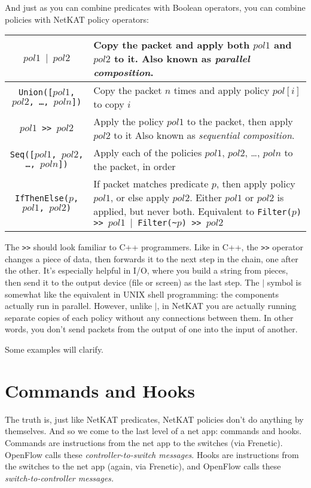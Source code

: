 And just as you can combine predicates with Boolean operators, you can combine policies with NetKAT 
policy operators:

\bigskip
\begin{tabularx}{6in}{|c|X|}
\hline\hline
\texttt{$pol1$ $\vert$ $pol2$} & Copy the packet and apply both $pol1$ and $pol2$ to it.   
Also known as \textit{parallel composition}.
\\ \hline  
\texttt{Union([$pol1$, $pol2$, \ldots, $poln$])} & 
Copy the packet $n$ times and apply policy $pol[i]$ to copy $i$
\\ \hline  
\texttt{$pol1$ >> $pol2$} & Apply the policy $pol1$ to the packet, then apply $pol2$ to it
Also known as \textit{sequential composition}.
\\ \hline  
\texttt{Seq([$pol1$, $pol2$, \ldots, $poln$])} & 
Apply each of the policies $pol1$, $pol2$, \ldots, $poln$ to the packet, in order 
\\ \hline  
\texttt{IfThenElse($p$, $pol1$, $pol2$)} & If packet matches predicate $p$, then apply policy $pol1$, or else
apply $pol2$.  
Either $pol1$ or $pol2$ is applied, but never both.
Equivalent to \texttt{Filter($p$) >> $pol1$ $\vert$ Filter(\textasciitilde$p$) >> $pol2$}
\\ \hline\hline
\end{tabularx}

\bigskip

The \texttt{>>} should look familiar to C++ programmers. 
Like in C++, the \texttt{>>} operator changes a piece of data, then forwards it to the next step in the chain, one
after the other.
It's especially helpful in I/O, where you build a string from pieces, then send it to the output device (file or screen) as the
last step.
The $\vert$ symbol is somewhat like the equivalent in UNIX shell programming: the components actually run in parallel.
However, unlike $\vert$, in NetKAT you are actually running separate copies of each policy without any connections
between them.
In other words, you don't send packets from the output of one into the input of another.

Some examples will clarify.

\section{Commands and Hooks}

The truth is, just like NetKAT predicates, NetKAT policies don't do anything by themselves.
And so we come to the last level of a net app: commands and hooks.
Commands are instructions from the net app to the switches (via Frenetic).  
OpenFlow calls these \emph{controller-to-switch messages}.  
Hooks are instructions from the switches to the net app (again, via Frenetic), and OpenFlow
calls these \emph{switch-to-controller messages.}

